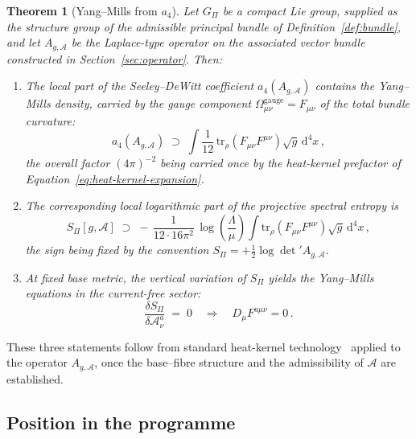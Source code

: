 \documentclass[12pt,a4paper]{article}
\theoremstyle{remark}
\theoremstyle{plain}
\newtheorem{theorem}{Theorem}
\theoremstyle{definition}
\begin{document}
      \begin{theorem}[Yang--Mills from $a_4$]
        \label{thm:main}
        Let $G_\Pi$ be a compact Lie group, supplied as the structure group of the
        admissible principal bundle of Definition~\ref{def:bundle}, and let
        $A_{g,\mathcal{A}}$ be the Laplace-type operator on the
        associated vector bundle constructed in
        Section~\ref{sec:operator}.
        Then:
        \begin{enumerate}[label=\textup{(\roman*)}]
        \item The local part of the Seeley--DeWitt coefficient
        $a_4(A_{g,\mathcal{A}})$ contains the Yang--Mills density,
        carried by the gauge component
        $\Omega^{\mathrm{gauge}}_{\mu\nu} = F_{\mu\nu}$ of the total
        bundle curvature:
        \[
          a_4(A_{g,\mathcal{A}})
          \;\supset\;
          \int
          \frac{1}{12}\,
          \mathrm{tr}_\rho(F_{\mu\nu}F^{\mu\nu})
          \sqrt{g}\,\mathrm{d}^4 x\,,
        \]
        the overall factor $(4\pi)^{-2}$ being carried once by the
        heat-kernel prefactor of
        Equation~\eqref{eq:heat-kernel-expansion}.
        \item The corresponding local logarithmic part of the
        projective spectral entropy is
        \[
          S_\Pi[g, \mathcal{A}]
          \;\supset\;
          -\,\frac{1}{12 \cdot 16\pi^2}\,
          \log\!\left(\frac{\Lambda}{\mu}\right)
          \int
          \mathrm{tr}_\rho(F_{\mu\nu}F^{\mu\nu})
          \sqrt{g}\,\mathrm{d}^4 x\,,
        \]
        the sign being fixed by the convention
        $S_\Pi = +\tfrac{1}{2}\log\det' A_{g,\mathcal{A}}$.
        \item At fixed base metric, the vertical variation of $S_\Pi$
        yields the Yang--Mills equations in the current-free sector:
        \[
          \frac{\delta S_\Pi}{\delta \mathcal{A}^a_\nu}
          \;=\; 0
          \quad\Longrightarrow\quad
          D_\mu F^{a\mu\nu} = 0\,.
        \]
        \end{enumerate}
      \end{theorem}

      These three statements follow from standard heat-kernel
      technology~\cite{Vassilevich2003,ParkerToms2009} applied to the
      operator $A_{g,\mathcal{A}}$, once the base--fibre structure and
      the admissibility of $\mathcal{A}$ are established.

    \subsection{Position in the programme}
      \label{subsec:position}
\end{document}
